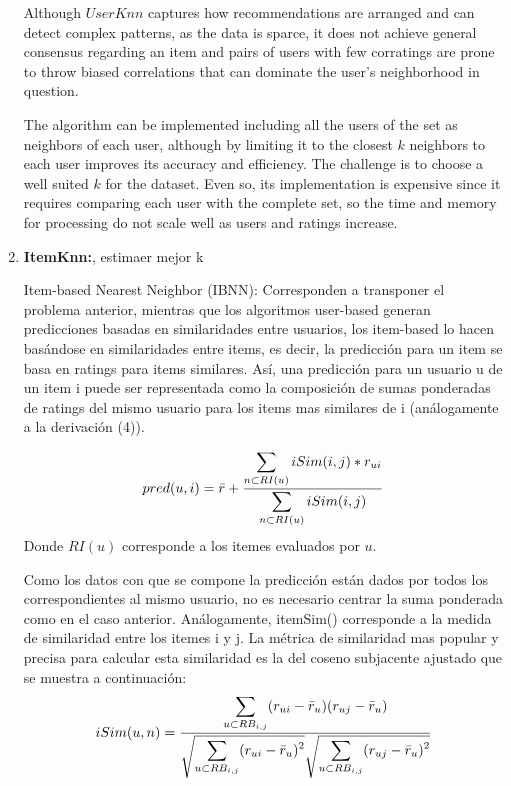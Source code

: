\documentclass[letterpaper, 10 pt, conference]{ieeeconf}  %
\begin{document}
\begin{enumerate}
    Although $UserKnn$ captures how recommendations are arranged and can detect complex patterns, as the data is sparce, it does not achieve general consensus regarding an item and pairs of users with few corratings are prone to throw biased correlations that can dominate the user's neighborhood in question.
    
    The algorithm can be implemented including all the users of the set as neighbors of each user, although by limiting it to the closest $k$ neighbors to each user improves its accuracy and efficiency. The challenge is to choose a well suited $k$ for the dataset. Even so, its implementation is expensive since it requires comparing each user with the complete set, so the time and memory for processing do not scale well as users and ratings increase. 
    
    
    \item \textbf{ItemKnn:}, estimaer mejor k
    
    Item-based Nearest Neighbor (IBNN): Corresponden a transponer el problema anterior, mientras que los algoritmos user-based generan predicciones basadas en similaridades entre usuarios, los item-based lo hacen basándose en similaridades entre items, es decir, la predicción para un item se basa en ratings para items similares. Así, una predicción para un usuario u de un item i puede ser representada como la composición de sumas ponderadas de ratings del mismo usuario para los items mas similares de i (análogamente a la derivación (4)).
    
    \begin{equation}
        pred(u,i)=\Bar{r}+ \frac{\displaystyle \sum_{n \subset RI(u)}iSim(i,j)*r_{ui}}{\displaystyle \sum_{n \subset RI(u)}iSim(i,j)}
    \end{equation}
    Donde $RI(u)$ corresponde a los itemes evaluados por $u$.
    
    Como los datos con que se compone la predicción están dados por todos los correspondientes al mismo usuario, no es necesario centrar la suma ponderada como en el caso anterior. Análogamente, itemSim() corresponde a la medida de similaridad entre los itemes i y j. La métrica de similaridad mas popular y precisa para calcular esta similaridad es la del coseno subjacente ajustado que se muestra a continuación: 
     \begin{equation}
        iSim(u,n)=\frac{\displaystyle \sum_{u \subset RB_{i,j}}(r_{ui}-\Bar{r}_{u})(r_{uj}-\Bar{r}_{u})}{ \sqrt{\displaystyle \sum_{u \subset RB_{i,j}}(r_{ui}-\Bar{r}_{u})^2}  \sqrt{\displaystyle \sum_{u \subset RB_{i,j}}(r_{uj}-\Bar{r}_{u})^2} }
    \end{equation}
    

\end{enumerate}
\end{document}
